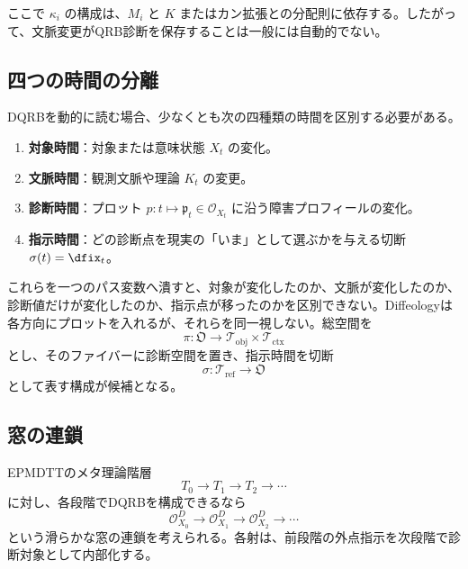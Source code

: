 \documentclass[a4paper,11pt]{ltjsarticle}
\theoremstyle{definition}
\theoremstyle{plain}
\begin{document}
ここで $\kappa_i$ の構成は、$M_i$ と $K$ またはカン拡張との分配則に依存する。したがって、文脈変更がQRB診断を保存することは一般には自動的でない。

\subsection{四つの時間の分離}

DQRBを動的に読む場合、少なくとも次の四種類の時間を区別する必要がある。
\begin{enumerate}
 \item \textbf{対象時間}：対象または意味状態 $X_t$ の変化。
 \item \textbf{文脈時間}：観測文脈や理論 $K_t$ の変更。
 \item \textbf{診断時間}：プロット $p:t\mapsto\mathfrak p_t\in\mathcal O_{X_t}$ に沿う障害プロフィールの変化。
 \item \textbf{指示時間}：どの診断点を現実の「いま」として選ぶかを与える切断 $\sigma(t)=\dfix_t$。
\end{enumerate}

これらを一つのパス変数へ潰すと、対象が変化したのか、文脈が変化したのか、診断値だけが変化したのか、指示点が移ったのかを区別できない。Diffeologyは各方向にプロットを入れるが、それらを同一視しない。総空間を
\begin{equation}
 \pi:\mathfrak O\longrightarrow\mathcal T_{\mathrm{obj}}
 \times\mathcal T_{\mathrm{ctx}}
 \end{equation}
とし、そのファイバーに診断空間を置き、指示時間を切断
\begin{equation}
 \sigma:\mathcal T_{\mathrm{ref}}\longrightarrow\mathfrak O
 \end{equation}
として表す構成が候補となる。

\subsection{窓の連鎖}

EPMDTTのメタ理論階層
\begin{equation}
 T_0\longrightarrow T_1\longrightarrow T_2\longrightarrow\cdots
\end{equation}
に対し、各段階でDQRBを構成できるなら
\begin{equation}
 \mathcal O_{X_0}^{D}
 \longrightarrow\mathcal O_{X_1}^{D}
 \longrightarrow\mathcal O_{X_2}^{D}
 \longrightarrow\cdots
 \label{eq:diffeological-windows}
\end{equation}
という滑らかな窓の連鎖を考えられる。各射は、前段階の外点指示を次段階で診断対象として内部化する。
\end{document}
